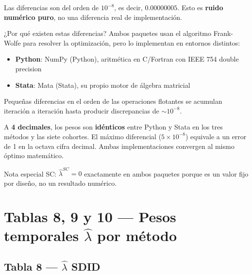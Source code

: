 \documentclass[11pt, a4paper]{article}
\newcommand{\py}{\textcolor{pyblue}{\textbf{Python}}}
\newcommand{\st}{\textcolor{stgreen}{\textbf{Stata}}}
\begin{document}
\begin{interpretacion}
Las diferencias son del orden de $10^{-8}$, es decir, $0.00000005$. Esto es
\textbf{ruido numérico puro}, no una diferencia real de implementación.

¿Por qué existen estas diferencias? Ambos paquetes usan el algoritmo
Frank-Wolfe para resolver la optimización, pero lo implementan en entornos distintos:
\begin{itemize}
  \item \py{}: NumPy (Python), aritmética en C/Fortran con IEEE 754 double precision
  \item \st{}: Mata (Stata), su propio motor de álgebra matricial
\end{itemize}
Pequeñas diferencias en el orden de las operaciones flotantes se acumulan iteración
a iteración hasta producir discrepancias de $\sim10^{-8}$.
\end{interpretacion}

\begin{resultado}
A \textbf{4 decimales}, los pesos son \textbf{idénticos} entre Python y Stata
en los tres métodos y las siete cohortes. El máximo diferencial ($5 \times 10^{-8}$)
equivale a un error de 1 en la octava cifra decimal. Ambas implementaciones
convergen al mismo óptimo matemático.

Nota especial SC: $\hat{\lambda}^{SC} = 0$ exactamente en ambos paquetes
porque es un valor fijo por diseño, no un resultado numérico.
\end{resultado}

\newpage
\section{Tablas 8, 9 y 10 — Pesos temporales $\hat{\lambda}$ por método}

\subsection{Tabla 8 — $\hat{\lambda}$ SDID}
\end{document}
